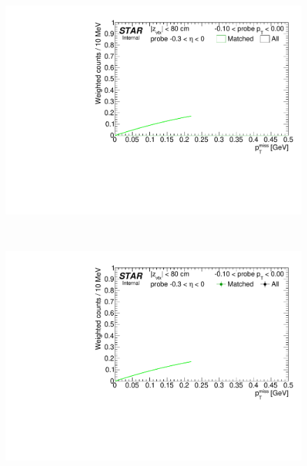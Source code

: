 \begin{figure}[h!]
{}~
\parbox{0.24\textwidth}{
  \centering
  \includegraphics[width=\linewidth,page=5]{graphics/correctionsToEff/TOF_tagAndProbe/Fitting_effVsPt_mc_ETABINS_C.CPT2.pdf}%

}~~~~
\parbox{0.24\textwidth}{ 
  \centering
  \includegraphics[width=\linewidth,page=6]{graphics/correctionsToEff/TOF_tagAndProbe/Fitting_effVsPt_data_ETABINS_C.CPT2.pdf}%

}
\end{figure}
